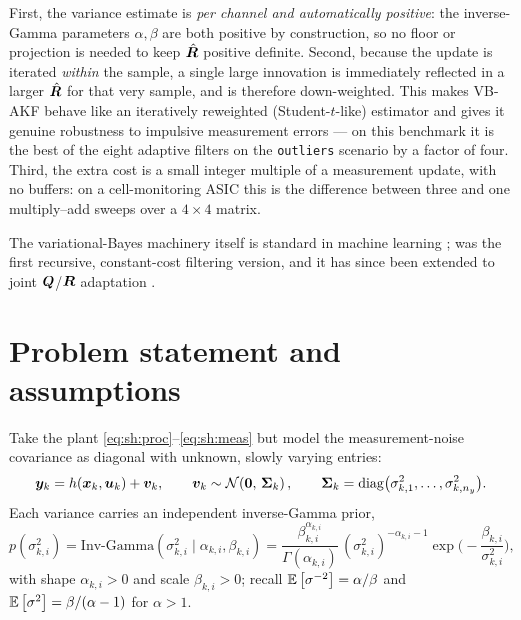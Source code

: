 First, the variance estimate is \emph{per channel and automatically positive}: the inverse-Gamma
parameters $\alpha,\beta$ are both positive by construction, so no floor or projection is needed to
keep $\hat{\bm{R}}$ positive definite.  Second, because the update is iterated \emph{within} the
sample, a single large innovation is immediately reflected in a larger $\hat{\bm{R}}$ for that very
sample, and is therefore down-weighted.  This makes VB-AKF behave like an iteratively reweighted
(Student-$t$-like) estimator and gives it genuine robustness to impulsive measurement errors --- on
this benchmark it is the best of the eight adaptive filters on the \texttt{outliers} scenario by a
factor of four.  Third, the extra cost is a small integer multiple of a measurement update, with
no buffers: on a cell-monitoring ASIC this is the difference between three and one multiply--add
sweeps over a $4\times4$ matrix.

The variational-Bayes machinery itself is standard in machine learning
\cite[Ch.~10]{bishop2006prml}\cite{beal2003vb}; \cite{sarkka2009vb} was the first recursive,
constant-cost filtering version, and it has since been extended to joint $\bm{Q}$/$\bm{R}$ adaptation
\cite{huang2018vbakf}.

\section{Problem statement and assumptions}
Take the plant \eqref{eq:sh:proc}--\eqref{eq:sh:meas} but model the measurement-noise covariance as
diagonal with unknown, slowly varying entries:
\begin{equation}
\bm{y}_k = h(\bm{x}_k,\bm{u}_k) + \bm{v}_k,\qquad
\bm{v}_k\sim\mathcal{N}\!\left(\bm 0,\,\bm{\Sigma}_k\right),\qquad
\bm{\Sigma}_k = \operatorname{diag}\!\big(\sigma^2_{k,1},\dots,\sigma^2_{k,n_y}\big).
\label{eq:vb:model}
\end{equation}
Each variance carries an independent inverse-Gamma prior,
\begin{equation}
p(\sigma^2_{k,i}) = \mathrm{Inv\text{-}Gamma}(\sigma^2_{k,i}\mid \alpha_{k,i},\beta_{k,i})
= \frac{\beta_{k,i}^{\alpha_{k,i}}}{\Gamma(\alpha_{k,i})}\,(\sigma^2_{k,i})^{-\alpha_{k,i}-1}
  \exp\!\Big(\!-\frac{\beta_{k,i}}{\sigma^2_{k,i}}\Big),
\label{eq:vb:ig}
\end{equation}
with shape $\alpha_{k,i}>0$ and scale $\beta_{k,i}>0$; recall
$\mathbb{E}\left[\sigma^{-2}\right] = \alpha/\beta$ and $\mathbb{E}\left[\sigma^2\right]=\beta/(\alpha-1)$ for $\alpha>1$.

